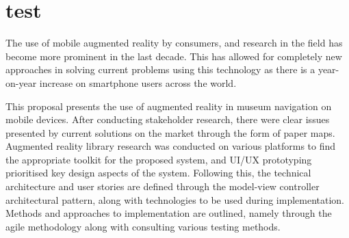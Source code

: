 
\section{test}
The use of mobile augmented reality by consumers, and research in the field has become more prominent in the last decade. This has allowed for completely new approaches in solving current problems using this technology as there is a year-on-year increase on smartphone users across the world. 

This proposal presents the use of augmented reality in museum navigation on mobile devices. After conducting stakeholder research, there were clear issues presented by current solutions on the market through the form of paper maps. Augmented reality library research was conducted on various platforms to find the appropriate toolkit for the proposed system, and UI/UX prototyping prioritised key design aspects of the system. Following this, the technical architecture and user stories are defined through the model-view controller architectural pattern, along with technologies to be used during implementation. Methods and approaches to implementation are outlined, namely through the agile methodology along with consulting various testing methods.